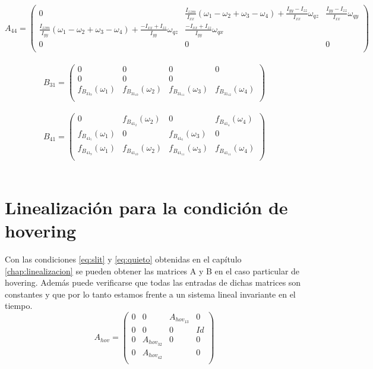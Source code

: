 \begin{equation}
A_{44}=\left(\begin{array}{ccc}
0 &\frac{I_{zzm}}{I_{xx}}(\omega_1-\omega_2+\omega_3-\omega_4) + \frac{I_{yy}-I_{zz}}{I_{xx}}\omega_{qz}& \frac{I_{yy}-I_{zz}}{I_{xx}}\omega_{qy} \\
\frac{I_{zzm}}{I_{yy}}(\omega_1-\omega_2+\omega_3-\omega_4) + \frac{-I_{xx}+I_{zz}}{I_{yy}}\omega_{qz} & \frac{-I_{xx}+I_{zz}}{I_{yy}}\omega_{qx}\\
0&0&0\\
\end{array}\right)
\end{equation}\\

\begin{equation}
B_{31}=\left(\begin{array}{cccc}
0 & 0 & 0 &0\\
0&0&0\\
f_{B_{31_9}}(\omega_1) & f_{B_{31_10}}(\omega_2) & f_{B_{31_11}}(\omega_3) &f_{B_{31_12}}(\omega_4)\\
\end{array}\right)
\end{equation}\\

\begin{equation}
B_{41}=\left(\begin{array}{cccc}
0 & f_{B_{41_2}}(\omega_2) & 0 & f_{B_{41_4}}(\omega_4)\\
f_{B_{41_5}}(\omega_1)&0&f_{B_{41_6}}(\omega_3)&0\\
f_{B_{41_9}}(\omega_1) & f_{B_{41_10}}(\omega_2) & f_{B_{41_11}}(\omega_3) &f_{B_{41_11}}(\omega_4)\\
\end{array}\right)
\end{equation}\\

\section{Linealizaci\'on para la condici\'on de hovering}
Con las condiciones \ref{eq:slit} y \ref{eq:quieto} obtenidas en el cap\'itulo \ref{chap:linealizacion} se pueden obtener las matrices A y B en el caso particular de hovering. Adem\'as puede verificarse que todas las entradas de dichas matrices son constantes y que por lo tanto estamos frente a un sistema lineal invariante en el tiempo.
\begin{equation}
\label{eq:Ahov}
A_{hov}=\left(\begin{array}{cccc}
0 & 0 & A_{hov_{13}} & 0 \\
0 & 0 & 0      & Id\\
0 & A_{hov_{32}} & 0 & 0\\
0 & A_{hov_{42}}      &  & 0 \\    
\end{array}\right)
\end{equation}\\


